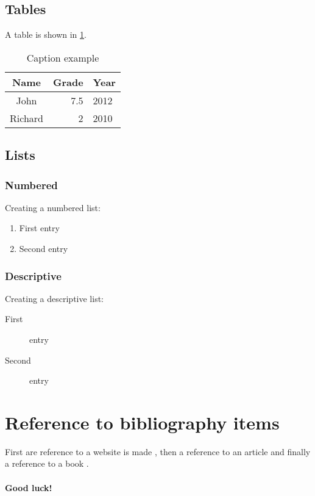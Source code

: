 \subsection{Tables} \label{subsec:tables}

A table is shown in \cref{tb:table}.
\begin{table}[h]
  \centering
  \caption{Caption example}
  \label{tb:table}
  \begin{tabular}{crl}
    \toprule
    Name     & Grade & Year    \\
    \midrule
    John     & 7.5   & 2012\\
    Richard  & 2     & 2010\\
    \bottomrule
  \end{tabular}
\end{table}

\subsection{Lists} \label{subsec:lists}
\subsubsection{Numbered}
Creating a numbered list:
\begin{enumerate}
  \item First entry
  \item Second entry
\end{enumerate}

\subsubsection{Descriptive}
Creating a descriptive list:
\begin{description}
  \item[First] entry
  \item[Second] entry
\end{description}


\section{Reference to bibliography items} \label{sec:bibliography}
First are reference to a website is made \cite{MiscEntry}, then a reference to an article \cite{ArticleEntry} and finally a reference to a book \cite{last2012}.

\paragraph{Good luck!}